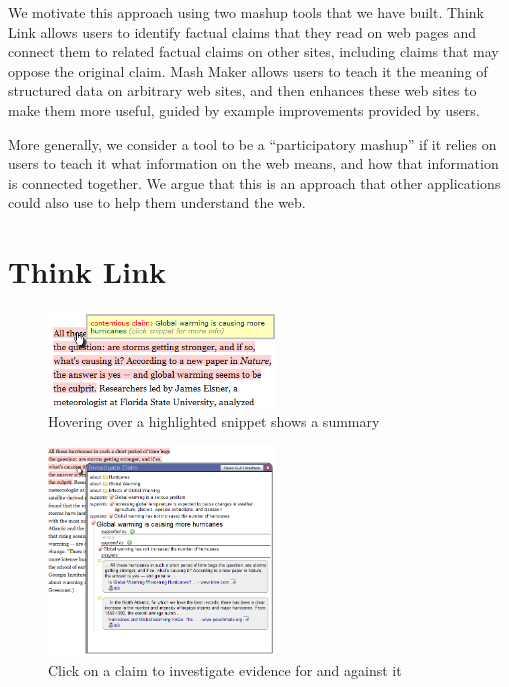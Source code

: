 \documentclass{chi2009}
\begin{document}
We motivate this approach using two mashup tools that we have built. Think Link allows users to identify factual claims that they read on web pages and connect them to related factual claims on other sites, including claims that may oppose the original claim. Mash Maker allows users to teach it the meaning of structured data on arbitrary web sites, and then enhances these web sites to make them more useful, guided by example improvements provided by users.

More generally, we consider a tool to be a ``participatory mashup'' if it relies on users to teach it what information on the web means, and how that information is connected together. We argue that this is an approach that other applications could also use to help them understand the web.

\section{Think Link}

\begin{figure}[tb]
	\begin{center}
	\includegraphics[width=6cm]{../screenshots/highlight_crop.png}
	\caption{Hovering over a highlighted snippet shows a summary}
	\label{highlight}
	\end{center}
\end{figure}

\begin{figure}[tb]
	\begin{center}
	\includegraphics[width=6cm]{../screenshots/claim_popup_crop2.png}
	\caption{Click on a claim to investigate evidence for and against it}
	\label{claimview}
	\end{center}
\end{figure}
\end{document}
